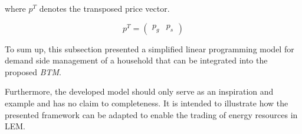 where $p^{T}$ denotes the transposed price vector.

\[
p^{T} =
  \begin{pmatrix}
p_{g} &
p_{s}
  \end{pmatrix}
\]



To sum up, this subsection presented a simplified linear 
programming model for demand side management of a household
that can be integrated into the proposed \textit{BTM}.

Furthermore, the developed model should only serve as an inspiration and example
and has no claim to completeness. 
It is intended to illustrate how the presented framework can be adapted to enable the trading of energy resources in LEM. 

\clearpage